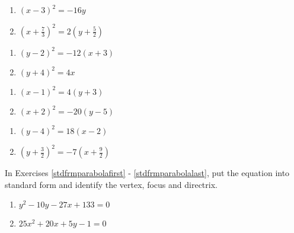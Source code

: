 \begin{multicols}{2}
\begin{enumerate}

\item $(x - 3)^{2} = -16y$ \label{parabolasketchfirst}
\item $\left(x + \frac{7}{3}\right)^{2} = 2\left(y + \frac{5}{2}\right)$


\setcounter{HW}{\value{enumi}}
\end{enumerate}
\end{multicols}

\begin{multicols}{2}
\begin{enumerate}
\setcounter{enumi}{\value{HW}}


\item $(y - 2)^{2} = -12(x + 3)$ 
\item $(y + 4)^{2} = 4x$

\setcounter{HW}{\value{enumi}}
\end{enumerate}
\end{multicols}

\begin{multicols}{2}
\begin{enumerate}
\setcounter{enumi}{\value{HW}}


\item $(x-1)^2 = 4(y+3)$
\item $(x+2)^2 = -20(y-5)$


\setcounter{HW}{\value{enumi}}
\end{enumerate}
\end{multicols}

\begin{multicols}{2}
\begin{enumerate}
\setcounter{enumi}{\value{HW}}

\item $(y-4)^2 = 18(x-2)$
\item $\left(y+ \frac{3}{2}\right)^2 = -7 \left(x+ \frac{9}{2}\right)$ \label{parabolasketchlast}


\setcounter{HW}{\value{enumi}}
\end{enumerate}
\end{multicols}



In Exercises \ref{stdfrmparabolafirst} - \ref{stdfrmparabolalast}, put the equation into standard form and identify the vertex, focus and directrix.

\begin{multicols}{2}
\begin{enumerate}
\setcounter{enumi}{\value{HW}}

\item $y^{2} - 10y - 27x + 133 = 0$ \label{stdfrmparabolafirst}
\item $25x^{2} + 20x + 5y - 1 = 0$

\setcounter{HW}{\value{enumi}}
\end{enumerate}
\end{multicols}


